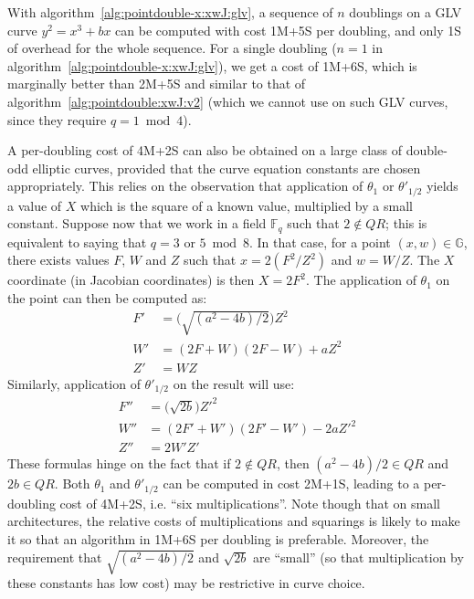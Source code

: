 \documentclass{llncs}
\newcommand{\bF}{\mathbb{F}}
\newcommand{\bG}{\mathbb{G}}
\begin{document}
With algorithm~\ref{alg:pointdouble-x:xwJ:glv}, a sequence of $n$ doublings
on a GLV curve $y^2 = x^3 + bx$ can be computed with cost 1M+5S per
doubling, and only 1S of overhead for the whole sequence. For
a single doubling ($n = 1$ in algorithm~\ref{alg:pointdouble-x:xwJ:glv}),
we get a cost of 1M+6S, which is marginally better than 2M+5S and
similar to that of algorithm~\ref{alg:pointdouble:xwJ:v2} (which we
cannot use on such GLV curves, since they require $q = 1\bmod 4$).

A per-doubling cost of 4M+2S can also be obtained on a large class of
double-odd elliptic curves, provided that the curve equation constants
are chosen appropriately. This relies on the observation that
application of $\theta_1$ or $\theta'_{1/2}$ yields a value of $X$ which
is the square of a known value, multiplied by a small constant. Suppose
now that we work in a field $\bF_q$ such that $2\notin QR$; this is
equivalent to saying that $q = 3$ or $5 \bmod 8$. In that case, for a
point $(x,w) \in \bG$, there exists values $F$, $W$ and $Z$ such that
$x = 2(F^2/Z^2)$ and $w = W/Z$. The $X$ coordinate (in Jacobian
coordinates) is then $X = 2F^2$. The application of $\theta_1$ on
the point can then be computed as:
\begin{align*}
    F' &= \Big(\sqrt{(a^2-4b)/2}\Big) Z^2 \\
    W' &= (2F + W)(2F - W) + a Z^2 \\
    Z' &= WZ
\end{align*}
Similarly, application of $\theta'_{1/2}$ on the result will use:
\begin{align*}
    F'' &= \Big(\sqrt{2b}\Big) Z'^2 \\
    W'' &= (2F' + W')(2F' - W') - 2a Z'^2 \\
    Z'' &= 2W'Z'
\end{align*}
These formulas hinge on the fact that if $2 \notin QR$, then $(a^2-4b)/2
\in QR$ and $2b \in QR$. Both $\theta_1$ and $\theta'_{1/2}$ can be
computed in cost 2M+1S, leading to a per-doubling cost of 4M+2S, i.e.
``six multiplications''. Note though that on small architectures, the
relative costs of multiplications and squarings is likely to make it so
that an algorithm in 1M+6S per doubling is preferable. Moreover, the
requirement that $\sqrt{(a^2-4b)/2}$ and $\sqrt{2b}$ are ``small'' (so
that multiplication by these constants has low cost) may be restrictive
in curve choice.
\end{document}
